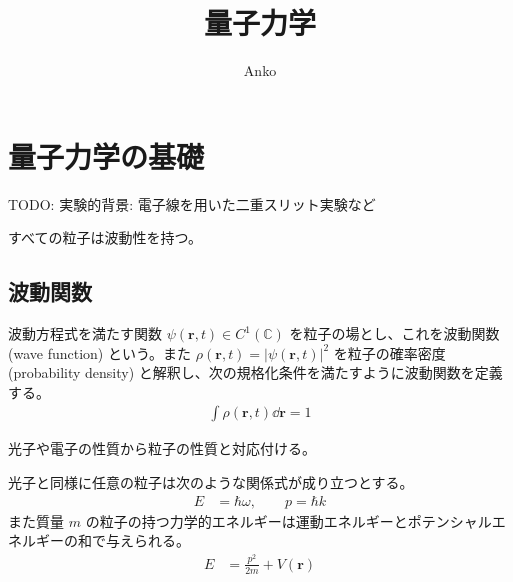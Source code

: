 \documentclass[uplatex,dvipdfmx,a4paper,11pt]{jlreq}
\title{量子力学}
\author{Anko}
\newcommand{\CC}{\mathbb{C}}
\newcommand{\rr}{\bm{r}}
\numberwithin{equation}{section}
\theoremstyle{definition}
\begin{document}
\maketitle
\tableofcontents
\clearpage

\section{量子力学の基礎}
TODO: 実験的背景: 電子線を用いた二重スリット実験など
\begin{axiom}[粒子の波動性]
  すべての粒子は波動性を持つ。
\end{axiom}

\subsection{波動関数}
\begin{definition}[波動関数]
  波動方程式を満たす関数 $\psi(\rr, t)\in C^1(\CC)$ を粒子の場とし、これを波動関数 (wave function) という。また $\rho(\rr, t) = |\psi(\rr, t)|^2$ を粒子の確率密度 (probability density) と解釈し、次の規格化条件を満たすように波動関数を定義する。
  \begin{align}
    \int\rho(\rr, t)\dd{\rr} = 1
  \end{align}
\end{definition}

光子や電子の性質から粒子の性質と対応付ける。
\begin{definition}[ド・ブロイの関係式]
  光子と同様に任意の粒子は次のような関係式が成り立つとする。
  \begin{align}
    E & = \hbar\omega, \qquad p = \hbar k
  \end{align}
  また質量 $m$ の粒子の持つ力学的エネルギーは運動エネルギーとポテンシャルエネルギーの和で与えられる。
  \begin{align}
    E & = \frac{p^2}{2m} + V(\rr)
  \end{align}
\end{definition}
\end{document}
